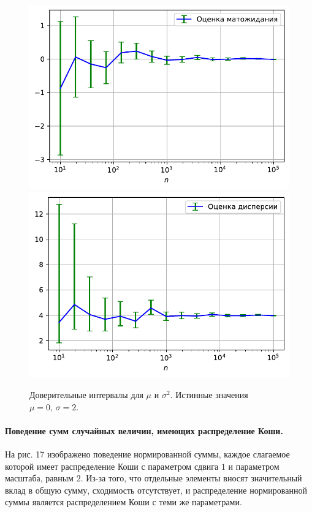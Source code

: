 \documentclass[16pt]{article}
\begin{document}
\begin{figure}[h]
	\center
	\includegraphics[scale=0.5]{5_3.pdf}
	\hfill
	\includegraphics[scale=0.5]{5_4.pdf}
	\caption{Доверительные интервалы для $\mu$ и $\sigma^2$. Истинные значения $\mu = 0,\, \sigma = 2$.}
\end{figure}

\paragraph{Поведение сумм случайных величин, имеющих распределение Коши.} На рис. 17 изображено поведение нормированной суммы, каждое слагаемое которой имеет распределение Коши с параметром сдвига $1$ и параметром масштаба, равным $2$. Из-за того, что отдельные элементы вносят значительный вклад в общую сумму, сходимость отсутствует, и распределение нормированной суммы является распределением Коши с теми же параметрами.
\end{document}
